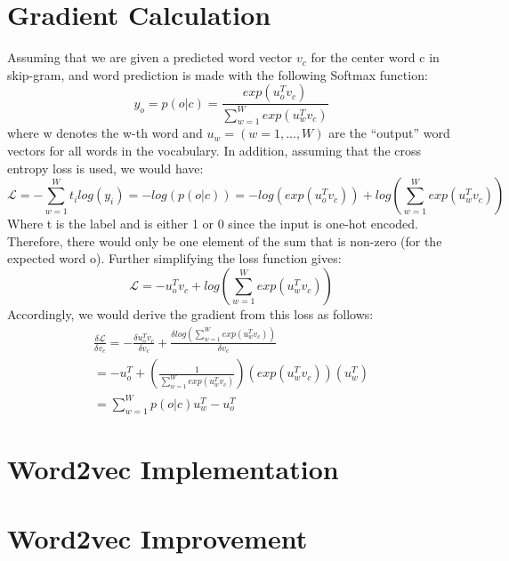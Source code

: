 \documentclass[12pt,a4paper]{article}
\begin{document}
	\section{Gradient Calculation}
	Assuming that we are given a predicted word vector $v_c$ for the center
word c in skip-gram, and word prediction is made with the following Softmax function:
	\begin{equation}
		y_o = p(o|c) = \frac{exp(u^T_ov_c)}{\sum_{w=1}^{W}exp(u^T_wv_c)}
	\end{equation}
	where w denotes the w-th word and $u_w= (w = 1, ..., W)$ are the “output” word
vectors for all words in the vocabulary. In addition, assuming that the cross entropy loss is used, we would have:
	\begin{equation}
		\mathcal{L} = - \sum_{w=1}^{W} t_i log(y_i) = - log(p(o|c)) = - log (exp(u^T_ov_c)) + log (\sum_{w=1}^{W}exp(u^T_wv_c))
	\end{equation}
	Where t is the label and is either 1 or 0 since the input is one-hot encoded. Therefore, there would only be one element of the sum that is non-zero (for the expected word o). Further simplifying the loss function gives:
	\begin{equation}
		\mathcal{L} = - u^T_ov_c + log (\sum_{w=1}^{W}exp(u^T_wv_c))
	\end{equation}
	Accordingly, we would derive the gradient from this loss as follows:
	\begin{equation}
		\begin{aligned}
			\frac{\delta \mathcal{L}}{\delta v_c} = -\frac{\delta u^T_ov_c}{\delta v_c} + \frac{\delta log(\sum_{w=1}^{W}exp(u^T_wv_c))}{\delta v_c} \qquad \qquad
			\\
			=-u^T_o + (\frac{1}{\sum_{w=1}^{W}exp(u^T_wv_c)})(exp(u^T_wv_c))(u_w^T)\\  =  \sum_{w=1}^{W} p(o|c) u_w^T - u^T_o\qquad \qquad\qquad \qquad \qquad
		\end{aligned}
	\end{equation}
	
	\section{Word2vec Implementation}
	
	\section{Word2vec Improvement}

	
\end{document}
